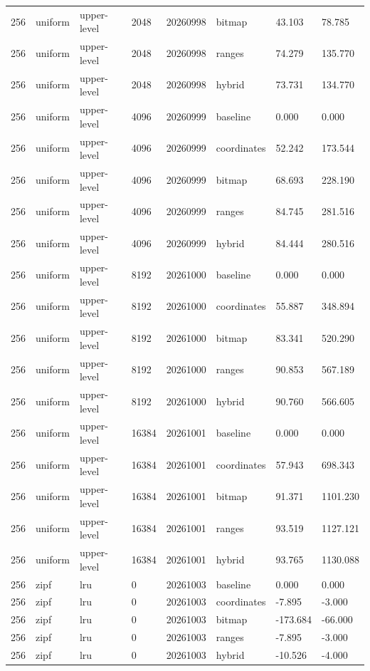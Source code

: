 \begin{tabular}{llllllll}
256 & uniform & upper-level & 2048 & 20260998 & bitmap & 43.103 & 78.785 \\
256 & uniform & upper-level & 2048 & 20260998 & ranges & 74.279 & 135.770 \\
256 & uniform & upper-level & 2048 & 20260998 & hybrid & 73.731 & 134.770 \\
256 & uniform & upper-level & 4096 & 20260999 & baseline & 0.000 & 0.000 \\
256 & uniform & upper-level & 4096 & 20260999 & coordinates & 52.242 & 173.544 \\
256 & uniform & upper-level & 4096 & 20260999 & bitmap & 68.693 & 228.190 \\
256 & uniform & upper-level & 4096 & 20260999 & ranges & 84.745 & 281.516 \\
256 & uniform & upper-level & 4096 & 20260999 & hybrid & 84.444 & 280.516 \\
256 & uniform & upper-level & 8192 & 20261000 & baseline & 0.000 & 0.000 \\
256 & uniform & upper-level & 8192 & 20261000 & coordinates & 55.887 & 348.894 \\
256 & uniform & upper-level & 8192 & 20261000 & bitmap & 83.341 & 520.290 \\
256 & uniform & upper-level & 8192 & 20261000 & ranges & 90.853 & 567.189 \\
256 & uniform & upper-level & 8192 & 20261000 & hybrid & 90.760 & 566.605 \\
256 & uniform & upper-level & 16384 & 20261001 & baseline & 0.000 & 0.000 \\
256 & uniform & upper-level & 16384 & 20261001 & coordinates & 57.943 & 698.343 \\
256 & uniform & upper-level & 16384 & 20261001 & bitmap & 91.371 & 1101.230 \\
256 & uniform & upper-level & 16384 & 20261001 & ranges & 93.519 & 1127.121 \\
256 & uniform & upper-level & 16384 & 20261001 & hybrid & 93.765 & 1130.088 \\
256 & zipf & lru & 0 & 20261003 & baseline & 0.000 & 0.000 \\
256 & zipf & lru & 0 & 20261003 & coordinates & -7.895 & -3.000 \\
256 & zipf & lru & 0 & 20261003 & bitmap & -173.684 & -66.000 \\
256 & zipf & lru & 0 & 20261003 & ranges & -7.895 & -3.000 \\
256 & zipf & lru & 0 & 20261003 & hybrid & -10.526 & -4.000 \\

\end{tabular}
